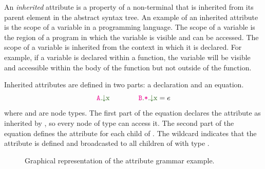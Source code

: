 An \emph{inherited} attribute is a property of a non-terminal that is inherited from
its parent element in the abstract syntax tree.
An example of an inherited attribute is the scope of a variable in a programming
language. The scope of a variable is the region of a program in which the variable
is visible and can be accessed. The scope of a variable is inherited from the
context in which it is declared. For example, if a variable is declared within a
function, the variable will be visible and accessible within the body of the function
but not outside of the function.


Inherited attributes are defined in two parts: a declaration and an equation.
\begin{equation*}
\Ainh{A}{x} \quad\quad \quad\quad \Ainhdef{B}{*}{x} = e
\end{equation*}
where  and  are node types.
The first part of the equation declares the attribute  as inherited by ,
so every node of type   can access it. The second part of the
equation defines the attribute for each child of . The wildcard \astnode{*}
indicates that the attribute is defined and broadcasted to all children of  with type .

\begin{figure}
    \caption{\label{fig:ragsExample} Graphical representation of the attribute grammar example.}
\end{figure}

